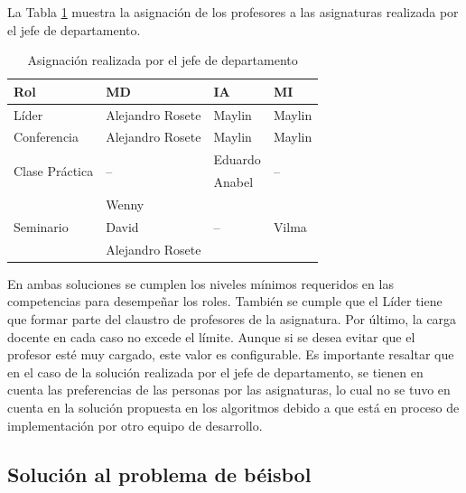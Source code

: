 La Tabla \ref{table:asignacion-jefe-departamento} muestra la asignación de los profesores a las asignaturas realizada por el jefe de departamento.

 \begin{table}[H]
 	\centering
 	\caption{Asignación realizada por el jefe de departamento} \label{table:asignacion-jefe-departamento}
 	\begin{tabular}{l p{3.3cm} l l}
 		\toprule
 		\textbf{Rol}                      & \textbf{MD}           & \textbf{IA}           & \textbf{MI}              \\ \midrule
 		Líder                             & Alejandro Rosete      & Maylin                & Maylin                   \\ \hline
 		Conferencia                       & Alejandro Rosete      & Maylin                & Maylin                   \\ \hline
 		\multirow{2}{3cm}{Clase Práctica} & \multirow{2}{2cm}{--} & Eduardo               & \multirow{2}{2cm}{--}    \\
 		                                  &                       & Anabel                &  \\ \hline
 		\multirow{3}{2cm}{Seminario}      & Wenny                 & \multirow{3}{2cm}{--} & \multirow{3}{2cm}{Vilma} \\
 		                                  & David                 &                       &  \\
 		                                  & Alejandro Rosete      &                       &  \\ \bottomrule
 	\end{tabular}
 \end{table}
  
En ambas soluciones se cumplen los niveles mínimos requeridos en las competencias para desempeñar  los roles. También se cumple que el Líder tiene que formar parte del claustro de profesores de la asignatura. Por último, la carga docente en cada caso no excede el límite. Aunque si se desea evitar que el profesor esté muy cargado, este valor es configurable. Es importante resaltar que en el caso de la solución realizada por el jefe de departamento, se tienen en cuenta las preferencias de las personas por las asignaturas, lo cual no se tuvo en cuenta en la solución propuesta en los algoritmos debido a que está en proceso de implementación por otro equipo de desarrollo.
 
\subsection{Solución al problema de  béisbol}


